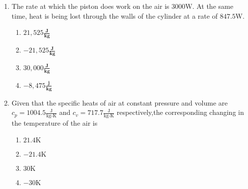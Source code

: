 \documentclass[journal]{IEEEtran}
\begin{document}
\begin{enumerate}[start=49]
\begin{figure}[H]
\label{fig:my_label}
\end{figure}
\item The rate at which the piston does work on the air is $3000\text{W}.$ At the same time, heat is being lost through the walls of the cylinder at a rate of $847.5\text{W}.$
\begin{multicols}{4}
    \begin{enumerate}
        \item $21,525\frac{\textbf{J}}{\textbf{kg}}$
        \item $-21,525\frac{\textbf{J}}{\textbf{kg}}$
        \item $30,000\frac{\textbf{J}}{\textbf{kg}}$
        \item $-8,475\frac{\textbf{j}}{\textbf{kg}}$        
    \end{enumerate}
\end{multicols}
\bigskip
\item Given that the specific heats of air at constant pressure and volume are $c_{p}=1004.5\frac{\text{J}}{\text{kg-K}}$ and $c_{v}=717.7\frac{\text{J}}{\text{kg-K}}$ respectively,the corresponding  changing in the temperature of the air is 
\begin{multicols}{4}
    \begin{enumerate}
        \item $21.4\text{K}$
        \item $-21.4\text{K}$
        \item $30\text{K}$
        \item $-30\text{K}$        
    \end{enumerate}
\end{multicols}




\end{enumerate}
\end{document}
